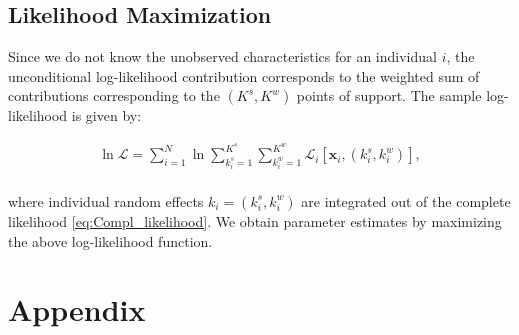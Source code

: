 \documentclass[12pt, a4paper]{article}
\renewcommand{\thefigure}{\Roman{figure}}
\begin{document}
\subsection{Likelihood Maximization}\label{sec:maximization}

Since we do not know the unobserved characteristics for an individual $i$, the unconditional log-likelihood contribution corresponds to the weighted sum of contributions corresponding to the $(K^{s},K^{w})$ points of support. The sample log-likelihood is given by:

\begin{align}\label{eq:Compl_likelihood}
\ln \mathcal{L} = \sum_{i=1}^{N} \ln \sum_{k_i^s=1}^{K^s} \sum_{k_i^w=1}^{K^w} \mathcal{L}_{i}[\textbf{x}_i, (k_i^{s},k_i^{w})], 	\\ \nonumber
\end{align}

where individual random effects $k_i = (k_i^s,k_i^w)$ are integrated out of the complete likelihood \ref{eq:Compl_likelihood}. We obtain parameter estimates by maximizing the above log-likelihood function.




\newpage
{}

%
 

\newpage
\setcounter{section}{0}
\renewcommand{\thesection}{\Alph{section}} 
\renewcommand{\thesubsection}{\thesection.\arabic{subsection}}
\section{Appendix\label{Sec: Preliminary}}
\setcounter{table}{0}
\renewcommand{\thetable}{A\arabic{table}}
\setcounter{figure}{0}
\renewcommand{\thefigure}{A\arabic{figure}}
\end{document}
